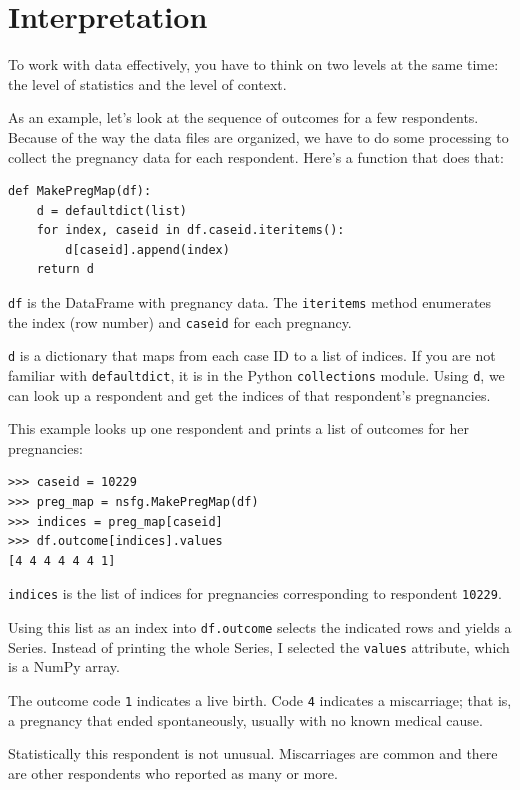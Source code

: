 \documentclass[12pt]{book}
\begin{document}
\section{Interpretation}

To work with data effectively, you have to think on two levels at the
same time: the level of statistics and the level of context.

As an example, let's look at the sequence of outcomes for a few
respondents.  Because of the way the data files are organized, we have
to do some processing to collect the pregnancy data for each respondent.
Here's a function that does that:

\begin{verbatim}
def MakePregMap(df):
    d = defaultdict(list)
    for index, caseid in df.caseid.iteritems():
        d[caseid].append(index)
    return d
\end{verbatim}

{\tt df} is the DataFrame with pregnancy data.  The {\tt iteritems}
method enumerates the index (row number)
and {\tt caseid} for each pregnancy.

{\tt d} is a dictionary that maps from each case ID to a list of
indices.  If you are not familiar with {\tt defaultdict}, it is in
the Python {\tt collections} module.
Using {\tt d}, we can look up a respondent and get the
indices of that respondent's pregnancies.

This example looks up one respondent and prints a list of outcomes
for her pregnancies:

\begin{verbatim}
>>> caseid = 10229
>>> preg_map = nsfg.MakePregMap(df)
>>> indices = preg_map[caseid]
>>> df.outcome[indices].values
[4 4 4 4 4 4 1]
\end{verbatim}

{\tt indices} is the list of indices for pregnancies corresponding
to respondent {\tt 10229}.

Using this list as an index into {\tt df.outcome} selects the
indicated rows and yields a Series.  Instead of printing the
whole Series, I selected the {\tt values} attribute, which is
a NumPy array.  

The outcome code {\tt 1} indicates a live birth. Code {\tt 4} indicates
a miscarriage; that is, a pregnancy that ended spontaneously, usually
with no known medical cause.

Statistically this respondent is not unusual.  Miscarriages are common
and there are other respondents who reported as many or more.
\end{document}
